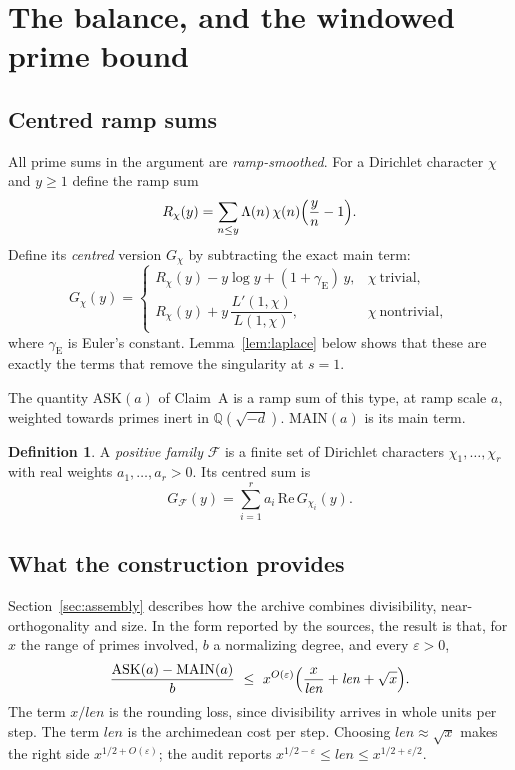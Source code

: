 \documentclass[11pt]{amsart}
\theoremstyle{definition}
\newtheorem{definition}[theorem]{Definition}
\theoremstyle{remark}
\newcommand{\len}{\mathit{len}}
\newcommand{\Q}{\mathbb{Q}}
\newcommand{\ASK}{\mathrm{ASK}}
\newcommand{\MAIN}{\mathrm{MAIN}}
\begin{document}
\section{The balance, and the windowed prime bound}\label{sec:balance}

\subsection{Centred ramp sums}\label{subsec:ramp}
All prime sums in the argument are \emph{ramp-smoothed}. For a Dirichlet character $\chi$ and $y\ge1$ define the ramp sum
\[
R_\chi(y)=\sum_{n\le y}\Lambda(n)\,\chi(n)\Bigl(\frac{y}{n}-1\Bigr).
\]
Define its \emph{centred} version $G_\chi$ by subtracting the exact main term:
\[
G_\chi(y)=
\begin{cases}
R_\chi(y)-y\log y+(1+\gamma_{\mathrm E})\,y, & \chi\ \text{trivial},\\[2pt]
R_\chi(y)+y\,\dfrac{L'(1,\chi)}{L(1,\chi)}, & \chi\ \text{nontrivial},
\end{cases}
\]
where $\gamma_{\mathrm E}$ is Euler's constant. Lemma~\ref{lem:laplace} below shows that these are exactly the terms that remove the singularity at $s=1$.

The quantity $\ASK(a)$ of Claim~A is a ramp sum of this type, at ramp scale $a$, weighted towards primes inert in $\Q(\sqrt{-d})$. $\MAIN(a)$ is its main term.

\begin{definition}\label{def:family}
A \emph{positive family} $\mathcal F$ is a finite set of Dirichlet characters $\chi_1,\dots,\chi_r$ with real weights $a_1,\dots,a_r>0$. Its centred sum is
\[
G_{\mathcal F}(y)=\sum_{i=1}^r a_i\,\mathrm{Re}\,G_{\chi_i}(y).
\]
\end{definition}

\subsection{What the construction provides}
Section~\ref{sec:assembly} describes how the archive combines divisibility, near-orthogonality and size. In the form reported by the sources, the result is that, for $x$ the range of primes involved, $b$ a normalizing degree, and every $\varepsilon>0$,
\begin{equation}\label{eq:balance}
\frac{\ASK(a)-\MAIN(a)}{b}\ \le\ x^{O(\varepsilon)}\Bigl(\frac{x}{\len}+\len+\sqrt x\Bigr).
\end{equation}
The term $x/\len$ is the rounding loss, since divisibility arrives in whole units per step. The term $\len$ is the archimedean cost per step. Choosing $\len\approx\sqrt x$ makes the right side $x^{1/2+O(\varepsilon)}$; the audit \cite{golf} reports $x^{1/2-\varepsilon}\le\len\le x^{1/2+\varepsilon/2}$.
\end{document}
